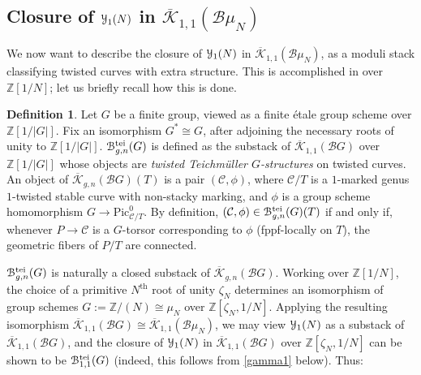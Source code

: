 \documentclass[11pt]{amsart}
\theoremstyle{definition}
\newtheorem{definition}[subsection]{Definition}
\begin{document}
\subsection*{Closure of ${\mathbf{\EuScript{Y}}}_1(N)$ in $\overline{\mathcal{K}}_{1,1}({\mathcal{B}} \mu_N)$}

We now want to describe the closure of ${\mathbf{\EuScript{Y}}}_1(N)$ in $\overline{\mathcal{K}}_{1,1} ({\mathcal{B}} \mu_N)$, as a moduli stack classifying twisted curves with extra structure. This is accomplished in \cite[\S5.2]{ACV} over $\mathbb{Z}[1/N]$; let us briefly recall how this is done. 

\begin{definition}
Let $G$ be a finite group, viewed as a finite \'etale group scheme over $\mathbb{Z}[1/|G|]$. Fix an isomorphism $G^* \cong G$, after adjoining the necessary roots of unity to $\mathbb{Z}[1/|G|]$. ${\mathbf{\EuScript{B}}}_{g,n}^{\textrm{tei}}(G)$ is defined as the substack of $\overline{\mathcal{K}}_{1,1}({\mathcal{B}} G)$ over $\mathbb{Z}[1/|G|]$ whose objects are \textit{twisted Teichm\"uller $G$-structures} on twisted curves. An object of $\overline{\mathcal{K}}_{g,n}({\mathcal{B}} G)(T)$ is a pair $({\mathcal{C}},\phi)$, where ${\mathcal{C}}/T$ is a $1$-marked genus $1$-twisted stable curve with non-stacky marking, and $\phi$ is a group scheme homomorphism $G \rightarrow \mathrm{Pic}^0_{{\mathcal{C}}/T}$. By definition, $({\mathcal{C}},\phi) \in {\mathbf{\EuScript{B}}}_{g,n}^{\textrm{tei}}(G)(T)$ if and only if, whenever $P \rightarrow {\mathcal{C}}$ is a $G$-torsor corresponding to $\phi$ (fppf-locally on $T$), the geometric fibers of $P/T$ are connected.
\end{definition}

${\mathbf{\EuScript{B}}}_{g,n}^{\textrm{tei}}(G)$ is naturally a closed substack of $\overline{\mathcal{K}}_{g,n}({\mathcal{B}} G)$. Working over $\mathbb{Z}[1/N]$, the choice of a primitive $N^{\mathrm{th}}$ root of unity $\zeta_N$ determines an isomorphism of group schemes $G := \mathbb{Z}/(N) \cong \mu_N$ over $\mathbb{Z}[\zeta_N,1/N]$. Applying the resulting isomorphism $\overline{\mathcal{K}}_{1,1}({\mathcal{B}} G) \cong \overline{\mathcal{K}}_{1,1}({\mathcal{B}}\mu_N)$, we may view ${\mathbf{\EuScript{Y}}}_1(N)$ as a substack of $\overline{\mathcal{K}}_{1,1}({\mathcal{B}} G)$, and the closure of ${\mathbf{\EuScript{Y}}}_1(N)$ in $\overline{\mathcal{K}}_{1,1}({\mathcal{B}} G)$ over $\mathbb{Z}[\zeta_N,1/N]$ can be shown to be ${\mathbf{\EuScript{B}}}_{1,1}^{\textrm{tei}}(G)$ (indeed, this follows from \ref{gamma1} below). Thus:
\end{document}
